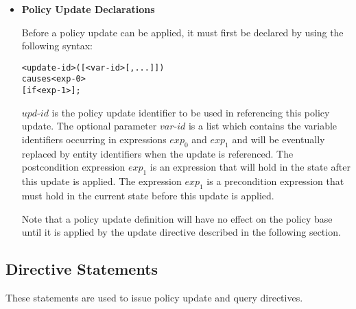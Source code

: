 \documentclass[11pt]{report}
\newenvironment{vverbatim}
{
  \begin{alltt}
}
{
    \vspace{-\baselineskip}
  \end{alltt}
}
\begin{document}
\begin{itemize}
          \item
            {\bf Policy Update Declarations}

            Before a policy update can be applied, it must first be declared
            by using the following syntax:

            \begin{vverbatim}
  <update-id>([<var-id>[, ...]])
    causes <exp-0>
    [if <exp-1>];
            \end{vverbatim}

            $upd$-$id$ is the policy update identifier to be used in
            referencing this policy update. The optional parameter
            $var$-$id$ is a list which contains the variable identifiers
            occurring in expressions $exp_0$ and $exp_1$ and will be
            eventually replaced by entity identifiers when the update is
            referenced. The postcondition expression $exp_1$ is an expression
            that will hold in the state after this update is applied.
            The expression $exp_1$ is a precondition expression that must
            hold in the current state before this update is applied.

            Note that a policy update definition will have no effect on the
            policy base until it is applied by the update directive
            described in the following section.

        \end{itemize}

      \subsection{Directive Statements}
        \label{subs-langl-dires}

        These statements are used to issue policy update and query directives.
\end{document}
